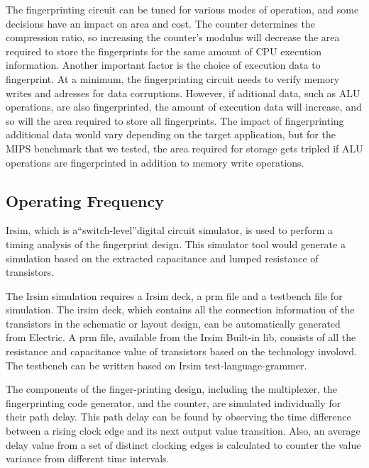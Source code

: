 \documentclass[10pt,journal,compsoc]{IEEEtran}
\begin{document}
The fingerprinting circuit can be tuned for various modes of operation, and some decisions have an impact on area and cost. The counter determines the compression ratio, so increasing the counter's modulus will decrease the area required to store the fingerprints for the same amount of CPU execution information. Another important factor is the choice of execution data to fingerprint. At a minimum, the fingerprinting circuit needs to verify memory writes and adresses for data corruptions. However, if aditional data, such as ALU operations, are also fingerprinted, the amount of execution data will increase, and so will the area required to store all fingerprints. The impact of fingerprinting additional data would vary depending on the target application, but for the MIPS benchmark that we tested, the area required for storage gets tripled if ALU operations are fingerprinted in addition to memory write operations. 

\subsection{Operating Frequency}
Irsim, which is a“switch-level”digital circuit simulator, is used to perform a timing analysis of the fingerprint design. This simulator tool would generate a simulation based on the extracted capacitance and lumped resistance of transistors.
    
    The Irsim simulation requires a Irsim deck, a prm file and a testbench file for simulation. The irsim deck, which contains all the connection information of the transistors in the schematic or layout design, can be automatically generated from Electric. A prm file, available from the Irsim Built-in lib, consists of all the resistance and capacitance value of transistors based on the technology involovd. The testbench can be written based on Irsim test-language-grammer.
    
    The components of the finger-printing design, including the multiplexer, the fingerprinting code generator, and the counter, are simulated individually for their path delay. This path delay can be found by observing the time difference between a rising clock edge and its next output value transition. Also, an average delay value from a set of distinct clocking edges is calculated to counter the value variance from different time intervals.
    
\end{document}
